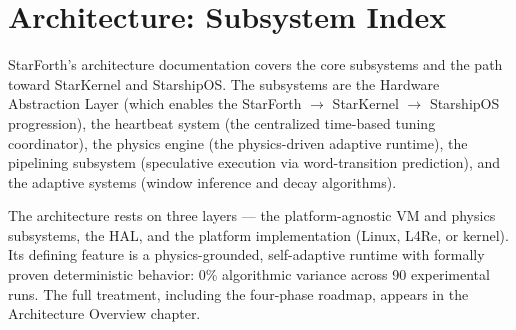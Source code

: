 
\section{Architecture: Subsystem Index}


StarForth's architecture documentation covers the core subsystems and the path
toward StarKernel and StarshipOS. The subsystems are the Hardware Abstraction
Layer (which enables the StarForth $\rightarrow$ StarKernel $\rightarrow$
StarshipOS progression), the heartbeat system (the centralized time-based
tuning coordinator), the physics engine (the physics-driven adaptive runtime),
the pipelining subsystem (speculative execution via word-transition
prediction), and the adaptive systems (window inference and decay algorithms).

The architecture rests on three layers --- the platform-agnostic VM and physics
subsystems, the HAL, and the platform implementation (Linux, L4Re, or kernel).
Its defining feature is a physics-grounded, self-adaptive runtime with formally
proven deterministic behavior: 0\% algorithmic variance across 90 experimental
runs. The full treatment, including the four-phase roadmap, appears in the
Architecture Overview chapter.

